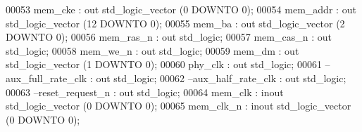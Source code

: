 \begin{DoxyCode}
00053         \textcolor{vhdlchar}{mem_cke}             \textcolor{vhdlchar}{:} \textcolor{keywordflow}{out} \textcolor{comment}{std\_logic\_vector} \textcolor{vhdlchar}{(}\textcolor{vhdllogic}{}\textcolor{vhdllogic}{0} \textcolor{keywordflow}{DOWNTO} \textcolor{vhdllogic}{}\textcolor{vhdllogic}{0}\textcolor{vhdlchar}{)};
00054         \textcolor{vhdlchar}{mem_addr}                \textcolor{vhdlchar}{:} \textcolor{keywordflow}{out} \textcolor{comment}{std\_logic\_vector} \textcolor{vhdlchar}{(}\textcolor{vhdllogic}{}\textcolor{vhdllogic}{12} \textcolor{keywordflow}{DOWNTO} \textcolor{vhdllogic}{}\textcolor{vhdllogic}{0}\textcolor{vhdlchar}{)};
00055         \textcolor{vhdlchar}{mem_ba}              \textcolor{vhdlchar}{:} \textcolor{keywordflow}{out} \textcolor{comment}{std\_logic\_vector} \textcolor{vhdlchar}{(}\textcolor{vhdllogic}{}\textcolor{vhdllogic}{2} \textcolor{keywordflow}{DOWNTO} \textcolor{vhdllogic}{}\textcolor{vhdllogic}{0}\textcolor{vhdlchar}{)};
00056         \textcolor{vhdlchar}{mem_ras_n}           \textcolor{vhdlchar}{:} \textcolor{keywordflow}{out} \textcolor{comment}{std\_logic};
00057         \textcolor{vhdlchar}{mem_cas_n}           \textcolor{vhdlchar}{:} \textcolor{keywordflow}{out} \textcolor{comment}{std\_logic};
00058         \textcolor{vhdlchar}{mem_we_n}                \textcolor{vhdlchar}{:} \textcolor{keywordflow}{out} \textcolor{comment}{std\_logic};
00059         \textcolor{vhdlchar}{mem_dm}              \textcolor{vhdlchar}{:} \textcolor{keywordflow}{out} \textcolor{comment}{std\_logic\_vector} \textcolor{vhdlchar}{(}\textcolor{vhdllogic}{}\textcolor{vhdllogic}{1} \textcolor{keywordflow}{DOWNTO} \textcolor{vhdllogic}{}\textcolor{vhdllogic}{0}\textcolor{vhdlchar}{)};
00060         \textcolor{vhdlchar}{phy_clk}             \textcolor{vhdlchar}{:} \textcolor{keywordflow}{out} \textcolor{comment}{std\_logic};
00061 \textcolor{keyword}{        --aux\_full\_rate\_clk : out std\_logic;}
00062 \textcolor{keyword}{        --aux\_half\_rate\_clk : out std\_logic;}
00063 \textcolor{keyword}{        --reset\_request\_n   : out std\_logic;}
00064         \textcolor{vhdlchar}{mem_clk}             \textcolor{vhdlchar}{:} \textcolor{keywordflow}{inout} \textcolor{comment}{std\_logic\_vector} \textcolor{vhdlchar}{(}\textcolor{vhdllogic}{}\textcolor{vhdllogic}{0} \textcolor{keywordflow}{DOWNTO} \textcolor{vhdllogic}{}\textcolor{vhdllogic}{0}\textcolor{vhdlchar}{)};
00065         \textcolor{vhdlchar}{mem_clk_n}           \textcolor{vhdlchar}{:} \textcolor{keywordflow}{inout} \textcolor{comment}{std\_logic\_vector} \textcolor{vhdlchar}{(}\textcolor{vhdllogic}{}\textcolor{vhdllogic}{0} \textcolor{keywordflow}{DOWNTO} \textcolor{vhdllogic}{}\textcolor{vhdllogic}{0}\textcolor{vhdlchar}{)};

\end{DoxyCode}
